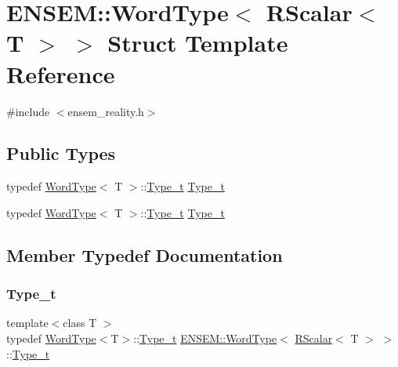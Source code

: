 \hypertarget{structENSEM_1_1WordType_3_01RScalar_3_01T_01_4_01_4}{}\section{E\+N\+S\+EM\+:\+:Word\+Type$<$ R\+Scalar$<$ T $>$ $>$ Struct Template Reference}
\label{structENSEM_1_1WordType_3_01RScalar_3_01T_01_4_01_4}


{\ttfamily \#include $<$ensem\+\_\+reality.\+h$>$}

\subsection*{Public Types}
\begin{DoxyCompactItemize}
\item 
typedef \mbox{\hyperlink{structENSEM_1_1WordType}{Word\+Type}}$<$ T $>$\+::\mbox{\hyperlink{structENSEM_1_1WordType_3_01RScalar_3_01T_01_4_01_4_a348d1b21435dcb68c291fefa3ae5c20c}{Type\+\_\+t}} \mbox{\hyperlink{structENSEM_1_1WordType_3_01RScalar_3_01T_01_4_01_4_a348d1b21435dcb68c291fefa3ae5c20c}{Type\+\_\+t}}
\item 
typedef \mbox{\hyperlink{structENSEM_1_1WordType}{Word\+Type}}$<$ T $>$\+::\mbox{\hyperlink{structENSEM_1_1WordType_3_01RScalar_3_01T_01_4_01_4_a348d1b21435dcb68c291fefa3ae5c20c}{Type\+\_\+t}} \mbox{\hyperlink{structENSEM_1_1WordType_3_01RScalar_3_01T_01_4_01_4_a348d1b21435dcb68c291fefa3ae5c20c}{Type\+\_\+t}}
\end{DoxyCompactItemize}


\subsection{Member Typedef Documentation}
\mbox{\label{structENSEM_1_1WordType_3_01RScalar_3_01T_01_4_01_4_a348d1b21435dcb68c291fefa3ae5c20c}} 
\subsubsection{\texorpdfstring{Type\_t}{Type\_t}\hspace{0.1cm}{\footnotesize\ttfamily [1/2]}}
{\footnotesize\ttfamily template$<$class T $>$ \\
typedef \mbox{\hyperlink{structENSEM_1_1WordType}{Word\+Type}}$<$T$>$\+::\mbox{\hyperlink{structENSEM_1_1WordType_3_01RScalar_3_01T_01_4_01_4_a348d1b21435dcb68c291fefa3ae5c20c}{Type\+\_\+t}} \mbox{\hyperlink{structENSEM_1_1WordType}{E\+N\+S\+E\+M\+::\+Word\+Type}}$<$ \mbox{\hyperlink{classENSEM_1_1RScalar}{R\+Scalar}}$<$ T $>$ $>$\+::\mbox{\hyperlink{structENSEM_1_1WordType_3_01RScalar_3_01T_01_4_01_4_a348d1b21435dcb68c291fefa3ae5c20c}{Type\+\_\+t}}}

